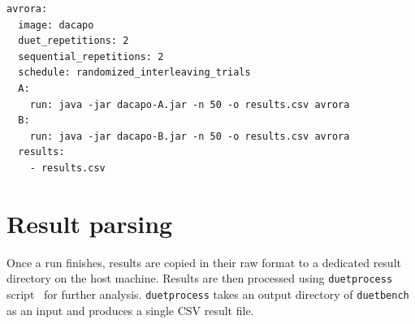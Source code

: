 \begin{listing}
    \begin{lstlisting}
avrora:
  image: dacapo
  duet_repetitions: 2
  sequential_repetitions: 2
  schedule: randomized_interleaving_trials
  A:
    run: java -jar dacapo-A.jar -n 50 -o results.csv avrora
  B:
    run: java -jar dacapo-B.jar -n 50 -o results.csv avrora
  results:
    - results.csv
    \end{lstlisting}
    \caption{
        Example part of YAML configuration file for \lstinline{duetbench} that runs \lstinline{avrora} benchmark from the DaCapo suite.
        In this case, both A and B versions are packaged in a single container image as Java JAR archives.
        Run command specifies how to invoke the DaCapo harness --- 50 iterations, results in \lstinline{results.csv} and run only \lstinline{avrora} benchmark.
        All the result files or directories need to be specified in \lstinline{results} array field.
        Note the correspondence between user input fields from this configuration and parameters in angled brackets from~\cref{fig:duetbench_sequence}.
        Furthermore, users can specify the number of repetitions for both asynchronous duet and sequential measurements, as well as the scheduling strategy for those runs.
    }
    \label{lst:config}
\end{listing}

\section{Result parsing}
\label{sec:result_parsing}

Once a run finishes, results are copied in their raw format to a dedicated result directory on the host machine.
Results are then processed using \lstinline{duetprocess} script~\cite{wiki} for further analysis.
\lstinline{duetprocess} takes an output directory of \lstinline{duetbench} as an input and produces a single CSV result file.

